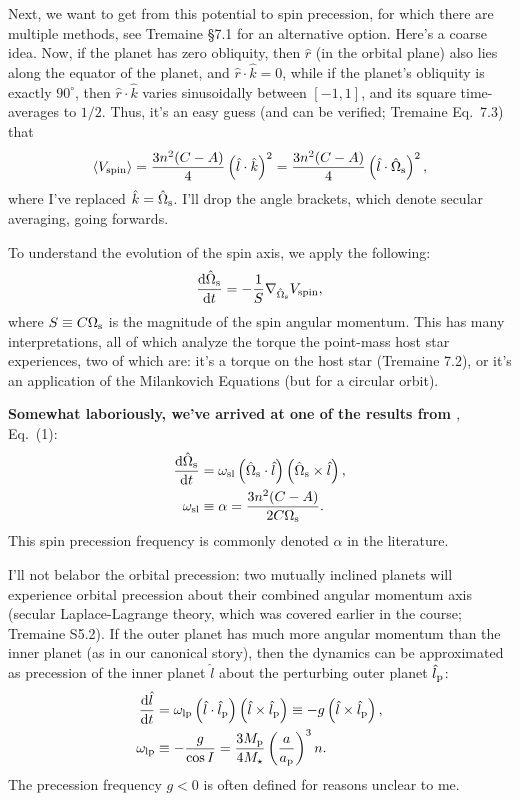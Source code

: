 \documentclass[11pt,
        usenames, %
        dvipsnames %
    ]{article}
\newcommand*{\rd}[2]{\frac{\mathrm{d}#1}{\mathrm{d}#2}}
\newcommand*{\ev}[1]{\left\langle#1\right\rangle}
\newcommand*{\p}[1]{\left(#1\right)}
\begin{document}
Next, we want to get from this potential to spin precession, for which there are
multiple methods, see Tremaine \S7.1 for an alternative option. Here's a coarse
idea. Now, if the planet has zero obliquity, then $\hat{r}$ (in the orbital
plane) also lies along the equator of the planet, and $\hat{r} \cdot \hat{k} =
0$, while if the planet's obliquity is exactly $90^\circ$, then $\hat{r} \cdot
\hat{k}$ varies sinusoidally between $[-1, 1]$, and its square time-averages to
$1/2$. Thus, it's an easy guess (and can be verified; Tremaine Eq.~7.3) that
\begin{equation}
    \ev{V_{\rm spin}}
        = \frac{3n^2(C - A)}{4}\p{\hat{l} \cdot \hat{k}}^2
        = \frac{3n^2(C - A)}{4}\p{\hat{l} \cdot \hat{\Omega}_{\rm s}}^2,
\end{equation}
where I've replaced $\hat{k} = \hat{\Omega}_{\rm s}$. I'll drop the angle
brackets, which denote secular averaging, going forwards.

To understand the evolution of the spin axis, we apply the following:
\begin{equation}
    \rd{\hat{\Omega}_{\rm s}}{t}
        = -\frac{1}{S}\nabla_{\hat{\Omega}_{\rm s}}V_{\rm
        spin},\label{eq:nablaS}
\end{equation}
where $S \equiv C\Omega_{\rm s}$ is the magnitude of the spin angular momentum.
This has many interpretations, all of which analyze the torque the point-mass
host star experiences, two of which are: it's a torque on the host star
(Tremaine 7.2), or it's an application of the Milankovich Equations (but for a
circular orbit).

\textbf{Somewhat laboriously, we've arrived at one of the results from
\citet{su2022dynamics}}, Eq.~(1):
\begin{align}
    \rd{\hat{\Omega}_{\rm s}}{t}
        &= \omega_{\rm sl}\p{\hat{\Omega}_{\rm s} \cdot
        \hat{l}}\p{\hat{\Omega}_{\rm s} \times \hat{l}},\label{eq:dsdt1}\\
    \omega_{\rm sl} &\equiv \alpha =
        \frac{3n^2(C - A)}{2C\Omega_{\rm s}}
            \label{eq:wsl}.
\end{align}
This spin precession frequency is commonly denoted $\alpha$ in the literature.

I'll not belabor the orbital precession: two mutually inclined planets will
experience orbital precession about their combined angular momentum axis
(secular Laplace-Lagrange theory, which was covered earlier in the course;
Tremaine S5.2). If the outer planet has much more angular momentum than the
inner planet (as in our canonical story), then the dynamics can be approximated
as precession of the inner planet $\hat{l}$ about the perturbing outer planet
$\hat{l}_{\rm p}$:
\begin{align}
    \rd{\hat{l}}{t} &= \omega_{\rm lp}\p{\hat{l} \cdot \hat{l}_{\rm p}}\p{\hat{l}
        \times \hat{l}_{\rm p}} \equiv -g\p{\hat{l} \times \hat{l}_{\rm p}},
        \label{eq:dldt1}\\
    \omega_{\rm lp} &\equiv -\frac{g}{\cos I}
        = \frac{3M_{\rm p}}{4M_\star}\p{\frac{a}{a_{\rm p}}}^3 n.\label{eq:wlp}
\end{align}
The precession frequency $g < 0$ is often defined for reasons unclear to me.
\end{document}

